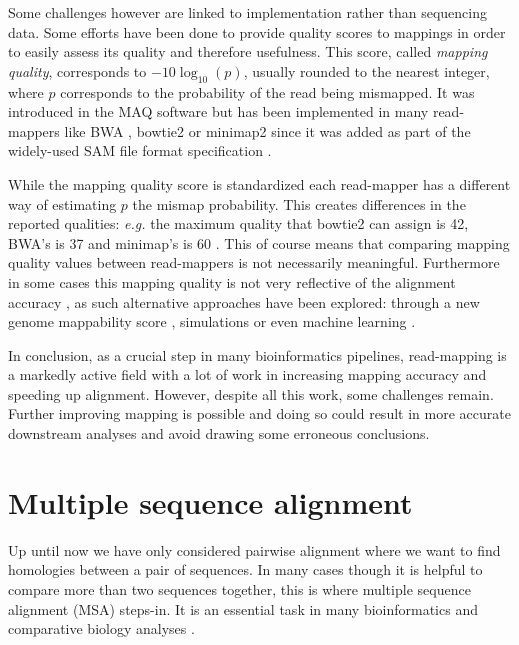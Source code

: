 \documentclass[
  11pt,
  twoside,
  BCOR=10mm,
  listof=totoc]{scrbook}
\begin{document}
Some challenges however are linked to implementation rather than sequencing data. Some efforts have been done to provide quality scores to mappings in order to easily assess its quality and therefore usefulness. This score, called \emph{mapping quality}, corresponds to \(-10\log_{10}(p)\), usually rounded to the nearest integer, where \(p\) corresponds to the probability of the read being mismapped. It was introduced in the MAQ software \autocite{liMappingShortDNA2008} but has been implemented in many read-mappers like BWA , bowtie2 \autocite{langmeadFastGappedreadAlignment2012} or minimap2 \autocite{liMinimap2PairwiseAlignment2018} since it was added as part of the widely-used SAM file format specification \autocite{liSequenceAlignmentMap2009a}.

While the mapping quality score is standardized each read-mapper has a different way of estimating \(p\) the mismap probability. This creates differences in the reported qualities: \emph{e.g.} the maximum quality that bowtie2 can assign is 42, BWA's is 37 and minimap's is 60 \autocite{UnderstandingMAPQScores}. This of course means that comparing mapping quality values between read-mappers is not necessarily meaningful. Furthermore in some cases this mapping quality is not very reflective of the alignment accuracy \autocite{ruffaloComparativeAnalysisAlgorithms2011}, as such alternative approaches have been explored: through a new genome mappability score \autocite{leeGenomicDarkMatter2012}, simulations \autocite{langmeadTandemSimulationFramework2017} or even machine learning \autocite{ruffaloAccurateEstimationShort2012}.

In conclusion, as a crucial step in many bioinformatics pipelines, read-mapping is a markedly active field with a lot of work in increasing mapping accuracy and speeding up alignment. However, despite all this work, some challenges remain. Further improving mapping is possible and doing so could result in more accurate downstream analyses and avoid drawing some erroneous conclusions.

\hypertarget{multiple-sequence-alignment}{%
\section{Multiple sequence alignment}\label{multiple-sequence-alignment}}

Up until now we have only considered pairwise alignment where we want to find homologies between a pair of sequences. In many cases though it is helpful to compare more than two sequences together, this is where multiple sequence alignment (MSA) steps-in. It is an essential task in many bioinformatics and comparative biology analyses \autocite{russellMultipleSequenceAlignment2014}.
\end{document}
